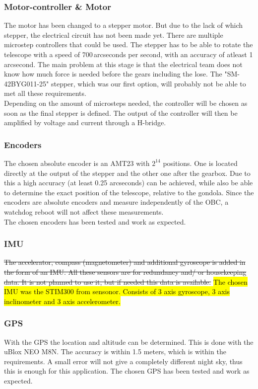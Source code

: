 \subsubsection{Motor-controller \& Motor}
{The motor has been changed to a stepper motor. But due to the lack of which stepper, the electrical circuit has not been made yet. There are multiple microstep controllers that could be used. The stepper has to be able to rotate the telescope with a speed of 700\,arcseconds per second, with an accuracy of atleast 1 arcsecond. The main problem at this stage is that the electrical team does not know how much force is needed before the gears including the lose. The "SM-42BYG011-25" stepper, which was our first option, will probably not be able to met all these requirements.\\

Depending on the amount of microsteps needed, the controller will be chosen as soon as the final stepper is defined. The output of the controller will then be amplified by voltage and current through a H-bridge.

\subsubsection{Encoders}
The chosen absolute encoder is an AMT23 with $2^{14}$ positions. One is located directly at the output of the stepper and the other one after the gearbox. Due to this a high accuracy (at least 0.25 arcseconds) can be achieved, while also be able to determine the exact position of the telescope, relative to the gondola. Since the encoders are absolute encoders and measure independently of the OBC, a watchdog reboot will not affect these measurements.\\

The chosen encoders has been tested and work as expected.


\hl{}

\subsubsection{IMU}
\st{The accelerator, compass (magnetometer) and additional gyroscope is added in the form of an IMU. All these sensors are for redundancy and/ or housekeeping data. It is not planned to use it, but if needed this data is available.}
\hl{The chosen IMU was the STIM300 from sensonor. Consists of 3 axis gyroscope, 3 axis inclinometer and 3 axis accelerometer.}

\subsubsection{GPS}
With the GPS the location and altitude can be determined. This is done with the uBlox NEO M8N. The accuracy is within 1.5 meters, which is within the requirements. A small error will not give a completely different night sky, thus this is enough for this application. The chosen GPS has been tested and work as expected.

}
